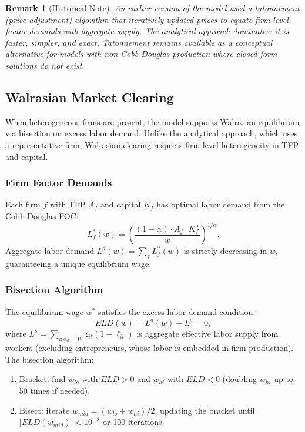 \documentclass[12pt]{article}
\newtheorem{remark}{Remark}
\begin{document}
\begin{remark}[Historical Note]
An earlier version of the model used a tatonnement (price adjustment) algorithm that iteratively updated prices to equate firm-level factor demands with aggregate supply. The analytical approach dominates: it is faster, simpler, and exact. Tatonnement remains available as a conceptual alternative for models with non-Cobb-Douglas production where closed-form solutions do not exist.
\end{remark}


\subsection{Walrasian Market Clearing}\label{sec:walrasian}

When heterogeneous firms are present, the model supports Walrasian equilibrium via bisection on excess labor demand. Unlike the analytical approach, which uses a representative firm, Walrasian clearing respects firm-level heterogeneity in TFP and capital.

\subsubsection{Firm Factor Demands}

Each firm $f$ with TFP $A_f$ and capital $K_f$ has optimal labor demand from the Cobb-Douglas FOC:
\begin{equation}\label{eq:firm_labor_demand}
  L_f^*(w) = \left(\frac{(1-\alpha) \cdot A_f \cdot K_f^{\alpha}}{w}\right)^{1/\alpha}.
\end{equation}
Aggregate labor demand $L^d(w) = \sum_f L_f^*(w)$ is strictly decreasing in $w$, guaranteeing a unique equilibrium wage.

\subsubsection{Bisection Algorithm}

The equilibrium wage $w^*$ satisfies the excess labor demand condition:
\begin{equation}\label{eq:excess_labor}
  ELD(w) = L^d(w) - L^s = 0,
\end{equation}
where $L^s = \sum_{i: o_{it} = W} z_{it} (1 - \ell_{it})$ is aggregate effective labor supply from workers (excluding entrepreneurs, whose labor is embedded in firm production). The bisection algorithm:
\begin{enumerate}
  \item Bracket: find $w_{lo}$ with $ELD > 0$ and $w_{hi}$ with $ELD < 0$ (doubling $w_{hi}$ up to 50 times if needed).
  \item Bisect: iterate $w_{mid} = (w_{lo} + w_{hi})/2$, updating the bracket until $|ELD(w_{mid})| < 10^{-8}$ or 100 iterations.
\end{enumerate}
\end{document}
